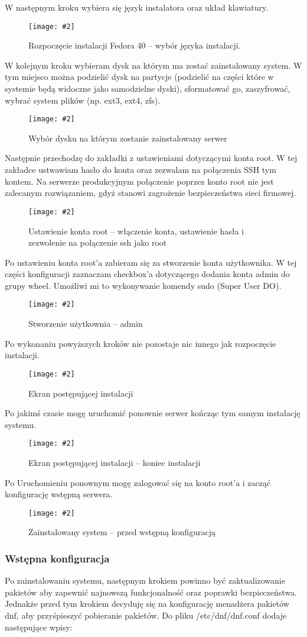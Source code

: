 \documentclass[a4paper]{article}
\newcommand*{\zdj}[2][\textwidth]{\texttt{[image: \#2]}}
\newcommand*{\fg}[4][!htb]{
      \begin{figure*}[#1]
            \zdj{#2}
            \caption[#4]{#3}
      \end{figure*}
}
\begin{document}
W następnym kroku wybiera się język instalatora oraz układ klawiatury.
\fg{contents/OS_installation/Fedora40/9.png}{Rozpoczęcie instalacji Fedora 40 – wybór języka instalacji.}{Rozpoczęcie instalacji Fedora}
\newpage

W kolejnym kroku wybieram dysk na którym ma zostać zainstalowany system. W tym miejsco można podzielić dysk na partycje (podzielić na części które w systemie będą widoczne jako samodzielne dyski), sformatować go, zaszyfrować, wybrać system plików (np. ext3, ext4, zfs).
\fg{contents/OS_installation/Fedora40/10.png}{Wybór dysku na którym zostanie zainstalowany serwer}{Wybór dysku instalacji}


Następnie przechodzę do zakładki z ustawieniami dotyczącymi konta root. W tej zakładce ustwawiam hasło do konta oraz zezwalam na połączenia SSH tym kontem. Na serwerze produkcyjnym połączenie poprzez konto root nie jest zalecanym rozwiązaniem, gdyż stanowi zagrożenie bezpieczeństwa sieci firmowej.
\fg{contents/OS_installation/Fedora40/11.png}{Ustawienie konta root – włączenie konta, ustawienie hasła i zezwolenie na połączenie ssh jako root}{Ustawienie konta root}
\newpage

Po ustawieniu konta root'a zabieram się za stworzenie konta użytkownika. W tej części konfiguracji zaznaczam checkbox'a dotyczącego dodania konta admin do grupy wheel. Umożliwi mi to wykonywanie komendy sudo (Super User DO).
\fg{contents/OS_installation/Fedora40/12.png}{Stworzenie użytkownia – admin}{Stworzenie użytkownia}

Po wykonaniu powyższych kroków nie pozostaje nic innego jak rozpoczęcie instalacji.
\fg{contents/OS_installation/Fedora40/13.png}{Ekran postępującej instalacji}{Ekran postępującej instalacji}
\newpage

Po jakimś czasie mogę uruchomić ponownie serwer kończąc tym samym instalację systemu.
\fg{contents/OS_installation/Fedora40/14.png}{Ekran postępującej instalacji – koniec instalacji}{Ekran przed restartem do systemu.}

Po Uruchomieniu ponownym mogę zalogować się na konto root'a i zacząć konfigurację wstępną serwera.
\fg{contents/OS_installation/Fedora40/15.png}{Zainstalowany system – przed wstępną konfiguracją}{Zainstalowany system Fedora 40}
\newpage

\subsubsection{Wstępna konfiguracja}
Po zainstalowaniu systemu, następnym krokiem powinno być zaktualizowanie pakietów aby zapewnić najnowszą funkcjonalność oraz poprawki bezpieczeństwa. Jednakże przed tym krokiem decyduję się na konfigurację menadżera pakietów dnf, aby przyśpieszyć pobieranie pakietów. Do pliku /etc/dnf/dnf.conf dodaje następujące wpisy:
\end{document}
